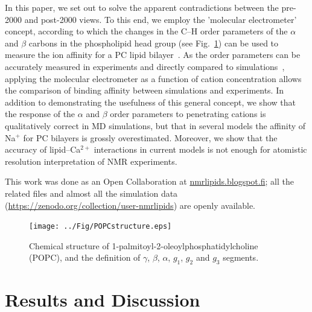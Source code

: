 \documentclass[twoside,twocolumn,9pt]{article}
\begin{document}
In this paper, we set out to solve the apparent contradictions
between the pre-2000 and post-2000 views.
To this end, we employ the 'molecular electrometer' concept,
according to which the changes in the C--H order parameters of the $\alpha$ and $\beta$ carbons 
in the phospholipid head group (see Fig.~\ref{POPCstructure}) can be used to measure the ion affinity for a
PC lipid bilayer~\cite{brown77,akutsu81,altenbach84,seelig87,scherer89}.
As the order parameters can be accurately measured in experiments and directly compared to 
simulations~\cite{ollila16}, applying the molecular electrometer as a function of cation concentration allows the 
comparison of binding affinity between simulations and experiments.
In addition to demonstrating the usefulness of this general concept,
we show that the response of the $\alpha$ and $\beta$ order parameters to penetrating cations
is qualitatively correct in MD simulations, but that in several  models the affinity of Na$^{+}$ for PC bilayers
is grossly overestimated.
Moreover, we show that the accuracy of lipid--Ca$^{2+}$ interactions 
in current models is not enough for atomistic resolution interpretation of NMR experiments. 

This work was done as an Open Collaboration at \url{nmrlipids.blogspot.fi};
all the related files \cite{githubIONpaper} %
and almost all the simulation data (\url{https://zenodo.org/collection/user-nmrlipids})
are openly available.

\begin{figure}[]
  \centering
  \texttt{[image: ../Fig/POPCstructure.eps]}

  \caption{\label{POPCstructure}
    Chemical structure of 1-palmitoyl-2-oleoylphosphatidylcholine (POPC), and the definition of $\gamma$, $\beta$, $\alpha$, $g_1$, $g_2$ and $g_3$ segments.}
  
\end{figure}


\section{Results and Discussion}
\end{document}
